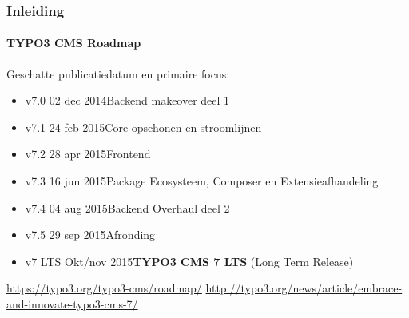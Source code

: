 \begin{frame}[fragile]
	\frametitle{Inleiding}
	\framesubtitle{TYPO3 CMS Roadmap}

	Geschatte publicatiedatum en primaire focus:

	\begin{itemize}
		\item v7.0 \tabto{1.1cm}02 dec 2014\tabto{3.4cm}Backend makeover deel 1
		\item v7.1 \tabto{1.1cm}24 feb 2015\tabto{3.4cm}Core opschonen en stroomlijnen
		\item v7.2 \tabto{1.1cm}28 apr 2015\tabto{3.4cm}Frontend
		\item v7.3 \tabto{1.1cm}16 jun 2015\tabto{3.4cm}Package Ecosysteem, Composer\newline
			\tabto{3.4cm}en Extensieafhandeling
		\item v7.4 \tabto{1.1cm}04 aug 2015\tabto{3.4cm}Backend Overhaul deel 2

		\item
			\begingroup
				\color{typo3orange}
					v7.5 \tabto{1.1cm}29 sep 2015\tabto{3.4cm}Afronding
			\endgroup

		\item v7 LTS \tabto{1.1cm}Okt/nov 2015\tabto{3.4cm}\textbf{TYPO3 CMS 7 LTS} (Long Term Release)
	\end{itemize}

	\smaller
		\url{https://typo3.org/typo3-cms/roadmap/}\newline
		\url{http://typo3.org/news/article/embrace-and-innovate-typo3-cms-7/}
	\normalsize

\end{frame}

